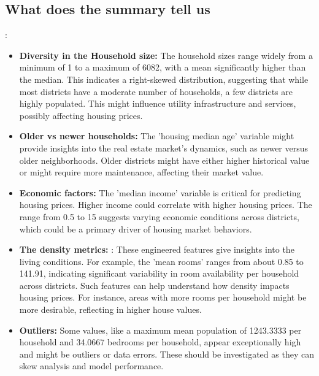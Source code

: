 \documentclass[12pt]{article}
\begin{document}
\subsection{What does the summary tell us}:
\begin{itemize}
\item \textbf{Diversity in the Household size: }The household sizes range widely from a minimum of 1 to a maximum of 6082, with a mean significantly higher than the median. This indicates a right-skewed distribution, suggesting that while most districts have a moderate number of households, a few districts are highly populated. This might influence utility infrastructure and services, possibly affecting housing prices.
\item \textbf{Older vs newer households: } The 'housing median age' variable might provide insights into the real estate market's dynamics, such as newer versus older neighborhoods. Older districts might have either higher historical value or might require more maintenance, affecting their market value.
\item \textbf{Economic factors: }  The 'median income' variable is critical for predicting housing prices. Higher income could correlate with higher housing prices. The range from 0.5 to 15 suggests varying economic conditions across districts, which could be a primary driver of housing market behaviors.
\item \textbf{The density metrics: } : These engineered features give insights into the living conditions. For example, the 'mean rooms' ranges from about 0.85 to 141.91, indicating significant variability in room availability per household across districts. Such features can help understand how density impacts housing prices. For instance, areas with more rooms per household might be more desirable, reflecting in higher house values.
\item \textbf{Outliers: } Some values, like a maximum mean population of 1243.3333 per household and 34.0667 bedrooms per household, appear exceptionally high and might be outliers or data errors. These should be investigated as they can skew analysis and model performance.

\end{itemize}
\end{document}
